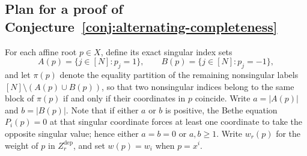 \documentclass[11pt]{article}
\theoremstyle{definition}
\begin{document}
\subsection{Plan for a proof of Conjecture~\ref{conj:alternating-completeness}}
\label{section:plan}

For each affine root $p\in X$, define its exact singular index sets
\[
A(p)=\{j\in[N]:p_j=1\},\qquad B(p)=\{j\in[N]:p_j=-1\},
\]
and let $\pi(p)$ denote the equality partition of the remaining nonsingular labels $[N]\setminus(A(p)\cup B(p))$, so that
two nonsingular indices belong to the same block of $\pi(p)$ if and only if their coordinates in $p$ coincide.
Write $a=|A(p)|$ and $b=|B(p)|$. Note that if either $a$ or $b$ is positive, the Bethe equation $P_i(p)=0$ at that singular coordinate forces at least one coordinate to take the opposite singular value; hence either $a=b=0$ or $a,b\ge 1$.
Write $w_r(p)$ for the weight of $p$ in $Z^{\mathrm{dep}}_r$, and set $w(p)=w_i$ when $p=x^i$.
\end{document}
